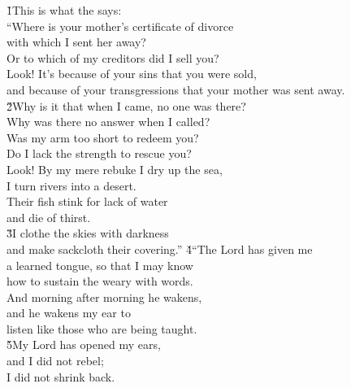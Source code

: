 \begin{poetry}
\poeml {}
\v{1}This is what the  says: \\
\poeml ``Where is your mother's certificate of divorce \\
\poemll    with which I sent her away? \\
\poeml Or to which of my creditors did I sell you? \\
\poemll    Look! It's because of your sins that you were sold, \\
\poemlll       and because of your transgressions that your mother was sent away. \\
\poeml \v{2}Why is it that when I came, no one was there? \\
\poemll    Why was there no answer when I called? \\
\poeml Was my arm too short to redeem you? \\
\poemll    Do I lack the strength to rescue you? \\
\poeml Look! By my mere rebuke I dry up the sea, \\
\poemll    I turn rivers into a desert. \\
\poeml Their fish stink for lack of water \\
\poemll    and die of thirst. \\
\poeml \v{3}I clothe the skies with darkness \\
\poemll    and make sackcloth their covering.''
\poeml \v{4}``The Lord  has given me \\
\poemll    a learned tongue, so that I may know \\
\poemlll       how to sustain the weary with words. \\
\poeml And morning after morning he wakens, \\
\poemll    and he wakens my ear to \\
\poemlll       listen like those who are being taught. \\
\poeml \v{5}My Lord  has opened my ears, \\
\poemll    and I did not rebel; \\
\poemlll       I did not shrink back. \\

\end{poetry}
